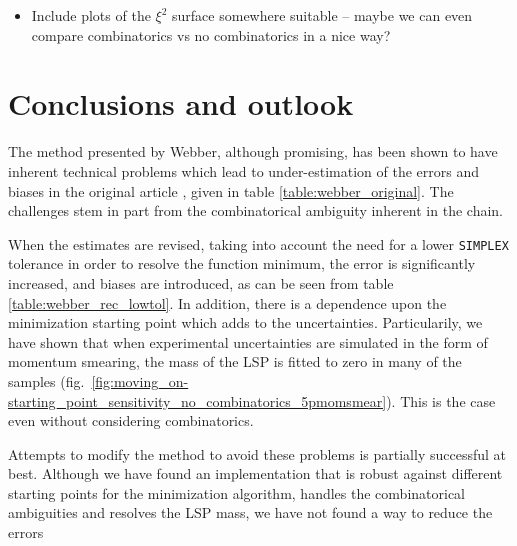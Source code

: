 \documentclass[twoside,english]{uiofysmaster}
\begin{document}
\begin{itemize}
	\item Include plots of the $\xi^2$ surface somewhere suitable -- maybe we can even compare combinatorics vs no combinatorics in a nice way?
\end{itemize}





\chapter{Conclusions and outlook} %
The method presented by Webber, although promising, has been shown to have inherent technical problems which lead to under-estimation of the errors and biases in the original article \cite{Webber:2009vm}, given in table \ref{table:webber_original}. The challenges stem in part from the combinatorical ambiguity inherent in the chain. 

When the estimates are revised, taking into account the need for a lower {\tt SIMPLEX} tolerance in order to resolve the function minimum, the error is significantly increased, and biases are introduced, as can be seen from table \ref{table:webber_rec_lowtol}. In addition, there is a dependence upon the minimization starting point which adds to the uncertainties. Particularily, we have shown that when experimental uncertainties are simulated in the form of momentum smearing, the mass of the LSP is fitted to zero in many of the samples (fig.\ \ref{fig:moving_on-starting_point_sensitivity_no_combinatorics_5pmomsmear}). This is the case even without considering combinatorics.

Attempts to modify the method to avoid these problems is partially successful at best. Although we have found an implementation that is robust against different starting points for the minimization algorithm, handles the combinatorical ambiguities and resolves the LSP mass, we have not found a way to reduce the errors 
\end{document}

